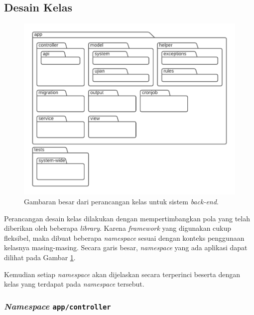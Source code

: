 \subsection{Desain Kelas}
    \begin{figure}
        \centering
        \includegraphics{Gambar/classmap-be/Classmap - Overview.pdf}
        \caption{Gambaran besar dari perancangan kelas untuk sistem \textit{back-end}.}
        \label{fig:classmap_overview}
    \end{figure}
    Perancangan desain kelas dilakukan dengan mempertimbangkan pola yang telah diberikan
    oleh beberapa \textit{library}. Karena \textit{framework} yang digunakan cukup 
    fleksibel, maka dibuat beberapa \textit{namespace} sesuai dengan 
    konteks penggunaan kelasnya masing-masing.
    Secara garis besar, \textit{namespace} yang ada aplikasi dapat dilihat pada Gambar 
    \ref{fig:classmap_overview}.
    
    Kemudian setiap \textit{namespace} akan dijelaskan secara terperinci beserta dengan
    kelas yang terdapat pada \textit{namespace} tersebut.

\subsubsection{\textit{Namespace} \texttt{app/controller}}
    
